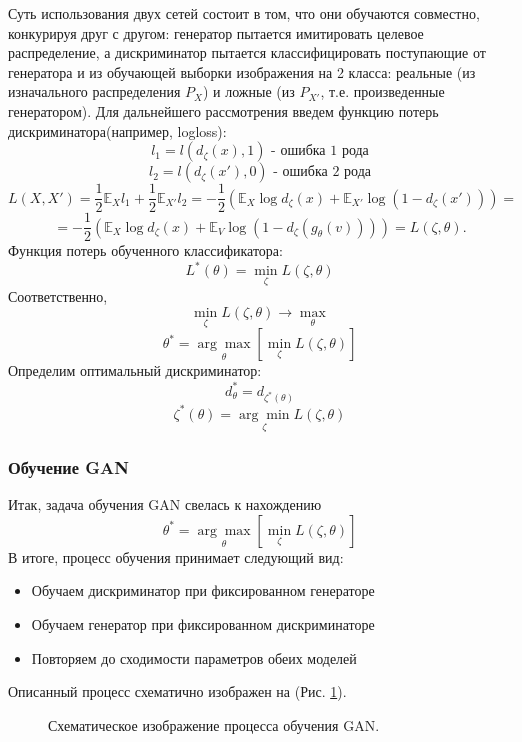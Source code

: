 			Суть использования двух сетей состоит в том, что они обучаются совместно, конкурируя друг с другом: генератор пытается имитировать целевое распределение, а дискриминатор пытается классифицировать поступающие от генератора и из обучающей выборки изображения на 2 класса: реальные (из изначального распределения $P_X$) и ложные (из $P_{X'}$, т.е. произведенные генератором).
			Для дальнейшего рассмотрения введем функцию потерь дискриминатора(например, logloss):
			$$ l_1 = l(d_{\zeta}(x), 1) \text{ - ошибка 1 рода} $$
			$$ l_2 = l(d_{\zeta}(x'), 0) \text{ - ошибка 2 рода}$$
			$$ L(X, X') = \frac{1}{2} \mathbb{E}_{X} l_1 + \frac{1}{2} \mathbb{E}_{X'} l_2 = -\frac{1}{2} (\mathbb{E}_{X} \log d_{\zeta}(x) + \mathbb{E}_{X'} \log (1 - d_{\zeta}(x'))) = $$
			$$ =  -\frac{1}{2} (\mathbb{E}_{X} \log d_{\zeta}(x) + \mathbb{E}_{V} \log (1 - d_{\zeta}(g_{\theta}(v)))) = L(\zeta, \theta) .$$
			Функция потерь обученного классификатора:
			$$ L^*(\theta) = \underset{\zeta}{\min} L(\zeta, \theta) $$
			Соответственно,
			$$ \underset{\zeta}{\min} L(\zeta, \theta) \longrightarrow \underset{\theta}{\max} $$
			$$ \theta^* = \underset{\theta}{\arg\max} \left[ \underset{\zeta}{\min} L(\zeta, \theta) \right] $$
			Определим оптимальный дискриминатор:
			$$ d^*_{\theta} = d_{\zeta^*(\theta)} $$
			$$ \zeta^*(\theta) =  \underset{\zeta}{\arg\min} L(\zeta, \theta)$$
		\subsubsection{Обучение GAN}
			Итак, задача обучения GAN свелась к нахождению
			$$ \theta^* = \underset{\theta}{\arg\max} \left[ \underset{\zeta}{\min} L(\zeta, \theta) \right] $$
			В итоге, процесс обучения принимает следующий вид:
	
			\begin{itemize}
				\item Обучаем дискриминатор при фиксированном генераторе
				\item Обучаем генератор при фиксированном дискриминаторе
				\item Повторяем до сходимости параметров обеих моделей
			\end{itemize}
			Описанный процесс схематично изображен на (Рис. \ref{5-gan-training}).
	
			\begin{figure}[h!]
				\caption{Схематическое изображение процесса обучения GAN.}
				\label{5-gan-training}
			\end{figure}
	
